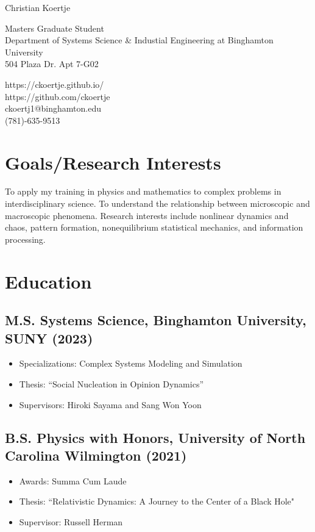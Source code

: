 \documentclass[12pt]{article}
\begin{document}
{\Huge Christian Koertje}

\begin{multicols}{2}
    Masters Graduate Student \\
    Department of Systems Science \& Industial Engineering at Binghamton University \\
    504 Plaza Dr. Apt 7-G02

    \columnbreak
    https://ckoertje.github.io/ \\
    https://github.com/ckoertje \\
    ckoertj1@binghamton.edu \\
    (781)-635-9513
\end{multicols}

\section{Goals/Research Interests}
To apply my training in physics and mathematics to complex problems in interdisciplinary science. To understand the relationship between microscopic and macroscopic phenomena. Research interests include nonlinear dynamics and chaos, pattern formation, nonequilibrium statistical mechanics, and information processing.

\section{Education}
\subsection{\textbf{M.S. Systems Science}, Binghamton University, SUNY \hfill (2023)}
\begin{itemize}
    \itemsep = 0em
    \item[] Specializations: Complex Systems Modeling and Simulation
    \item[] Thesis: ``Social Nucleation in Opinion Dynamics''
    \item[] Supervisors: Hiroki Sayama and Sang Won Yoon
\end{itemize}

\subsection{\textbf{B.S. Physics with Honors}, University of North Carolina Wilmington \hfill (2021)}
\begin{itemize}
    \itemsep = 0em
    \item[] Awards: Summa Cum Laude
    \item[] Thesis: ``Relativistic Dynamics: A Journey to the Center of a Black Hole"
    \item[] Supervisor: Russell Herman
\end{itemize}
\end{document}
